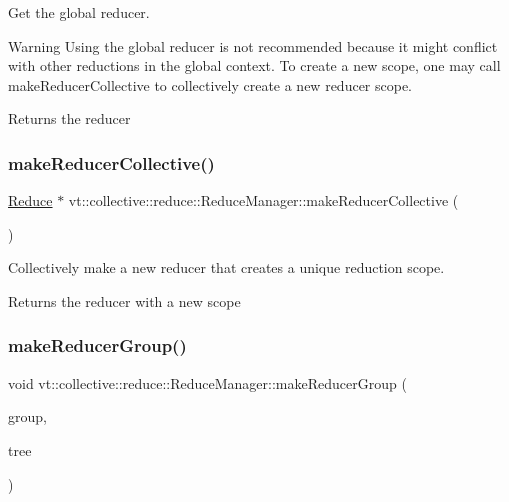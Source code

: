 Get the global reducer. 

\begin{DoxyWarning}{Warning}
Using the global reducer is not recommended because it might conflict with other reductions in the global context. To create a new scope, one may call {\ttfamily make\+Reducer\+Collective} to collectively create a new reducer scope.
\end{DoxyWarning}
\begin{DoxyReturn}{Returns}
the reducer 
\end{DoxyReturn}
\mbox{\label{structvt_1_1collective_1_1reduce_1_1_reduce_manager_a4b81ceab5d9f081f393dd68cece25935}} 
\subsubsection{\texorpdfstring{make\+Reducer\+Collective()}{makeReducerCollective()}}
{\footnotesize\ttfamily \hyperlink{structvt_1_1collective_1_1reduce_1_1_reduce}{Reduce} $\ast$ vt\+::collective\+::reduce\+::\+Reduce\+Manager\+::make\+Reducer\+Collective (\begin{DoxyParamCaption}{ }\end{DoxyParamCaption})}



Collectively make a new reducer that creates a unique reduction scope. 

\begin{DoxyReturn}{Returns}
the reducer with a new scope 
\end{DoxyReturn}
\mbox{\label{structvt_1_1collective_1_1reduce_1_1_reduce_manager_a44fa84680d3b310f4cb3f6c776a31751}} 
\subsubsection{\texorpdfstring{make\+Reducer\+Group()}{makeReducerGroup()}}
{\footnotesize\ttfamily void vt\+::collective\+::reduce\+::\+Reduce\+Manager\+::make\+Reducer\+Group (\begin{DoxyParamCaption}\item[{\hyperlink{namespacevt_a27b5e4411c9b6140c49100e050e2f743}{Group\+Type} const \&}]{group,  }\item[{\hyperlink{structvt_1_1collective_1_1tree_1_1_tree}{collective\+::tree\+::\+Tree} $\ast$}]{tree }\end{DoxyParamCaption})}



